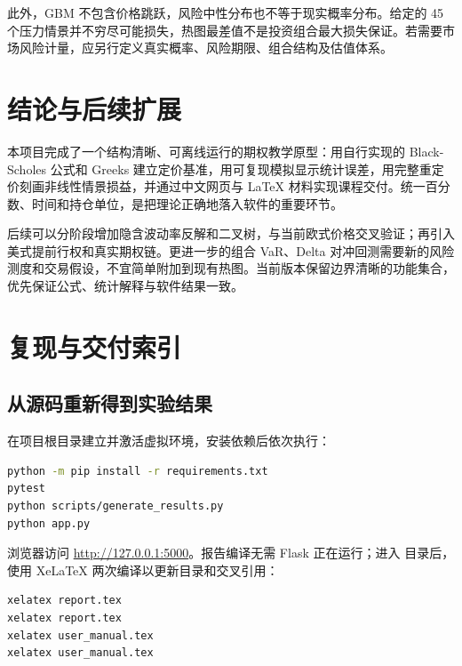 \documentclass[UTF8,a4paper,12pt]{ctexart}
\begin{document}
此外，GBM 不包含价格跳跃，风险中性分布也不等于现实概率分布。给定的 45 个压力情景并不穷尽可能损失，热图最差值不是投资组合最大损失保证。若需要市场风险计量，应另行定义真实概率、风险期限、组合结构及估值体系。

\section{结论与后续扩展}
本项目完成了一个结构清晰、可离线运行的期权教学原型：用自行实现的 Black-Scholes 公式和 Greeks 建立定价基准，用可复现模拟显示统计误差，用完整重定价刻画非线性情景损益，并通过中文网页与 LaTeX 材料实现课程交付。统一百分数、时间和持仓单位，是把理论正确地落入软件的重要环节。

后续可以分阶段增加隐含波动率反解和二叉树，与当前欧式价格交叉验证；再引入美式提前行权和真实期权链。更进一步的组合 VaR、Delta 对冲回测需要新的风险测度和交易假设，不宜简单附加到现有热图。当前版本保留边界清晰的功能集合，优先保证公式、统计解释与软件结果一致。
\newpage

\section*{复现与交付索引}
\subsection*{从源码重新得到实验结果}
在项目根目录建立并激活虚拟环境，安装依赖后依次执行：
\begin{lstlisting}[language=bash]
python -m pip install -r requirements.txt
pytest
python scripts/generate_results.py
python app.py
\end{lstlisting}
浏览器访问 \url{http://127.0.0.1:5000}。报告编译无需 Flask 正在运行；进入  目录后，使用 XeLaTeX 两次编译以更新目录和交叉引用：
\begin{lstlisting}[language=bash]
xelatex report.tex
xelatex report.tex
xelatex user_manual.tex
xelatex user_manual.tex
\end{lstlisting}
\end{document}

